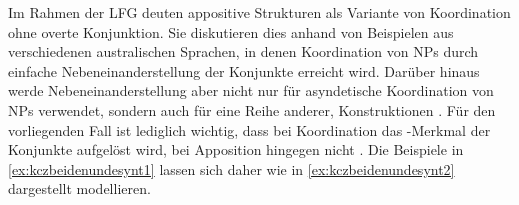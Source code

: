 Im Rahmen der LFG deuten \citet{sadlernordlinger2006} appositive Strukturen als
Variante von Koordination ohne overte Konjunktion. Sie diskutieren dies anhand
von Beispielen aus verschiedenen australischen Sprachen, in denen Koordination
von NPs durch einfache Nebeneinanderstellung der Konjunkte erreicht wird.
Darüber hinaus werde Nebeneinanderstellung aber nicht nur für asyndetische
Koordination von NPs verwendet, sondern auch für eine Reihe anderer,
 Konstruktionen
\autocite[440--441]{sadlernordlinger2006}. Für den vorliegenden Fall ist
lediglich wichtig, dass bei Koordination das \Index-Merkmal der Konjunkte
aufgelöst wird, bei Apposition hingegen nicht
\autocite[444]{sadlernordlinger2006}. Die Beispiele in
\cref{ex:kczbeidenundesynt1} lassen sich daher wie in
\cref{ex:kczbeidenundesynt2} dargestellt modellieren.

